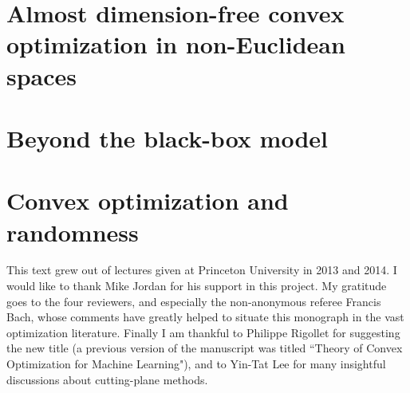 \documentclass[openany]{now}
\begin{document}
\chapter{Almost dimension-free convex optimization in non-Euclidean spaces}
\label{mirror}


\chapter{Beyond the black-box model}
\label{beyond}


\chapter{Convex optimization and randomness}
\label{rand}


\begin{acknowledgements}
This text grew out of lectures given at Princeton University in 2013 and 2014. I would like to thank Mike Jordan for his support in this project.
My gratitude goes to the four reviewers, and especially the non-anonymous referee Francis Bach, whose comments have greatly helped
to situate this monograph in the vast optimization literature. Finally I am thankful to Philippe Rigollet for suggesting the new title (a previous version of the manuscript was titled ``Theory of Convex Optimization for Machine Learning"), and to Yin-Tat Lee for many insightful discussions about cutting-plane methods.
\end{acknowledgements}



\end{document}
